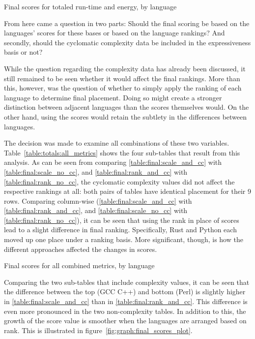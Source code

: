 \begin{table}[!htb]

\caption{Final scores for totaled run-time and energy, by language}
\label{table:totals:runtime-energy}
\end{table}

From here came a question in two parts: Should the final scoring be based on the languages' scores for these bases or based on the language rankings? And secondly, should the cyclomatic complexity data be included in the expressiveness basis or not?

While the question regarding the complexity data has already been discussed, it still remained to be seen whether it would affect the final rankings. More than this, however, was the question of whether to simply apply the ranking of each language to determine final placement. Doing so might create a stronger distinction between adjacent languages than the scores themselves would. On the other hand, using the scores would retain the subtlety in the differences between languages.

The decision was made to examine all combinations of these two variables. Table~\ref{table:totals:all_metrics} shows the four sub-tables that result from this analysis. As can be seen from comparing \ref{table:final:scale_and_cc} with \ref{table:final:scale_no_cc}, and \ref{table:final:rank_and_cc} with \ref{table:final:rank_no_cc}, the cyclomatic complexity values did not affect the respective rankings at all: both pairs of tables have identical placement for their 9 rows. Comparing column-wise (\ref{table:final:scale_and_cc} with \ref{table:final:rank_and_cc}, and \ref{table:final:scale_no_cc} with \ref{table:final:rank_no_cc}), it can be seen that using the rank in place of scores lead to a slight difference in final ranking. Specifically, Rust and Python each moved up one place under a ranking basis. More significant, though, is how the different approaches affected the changes in scores.

\begin{table}[!htb]

\caption{Final scores for all combined metrics, by language}
\label{table:totals:all_metrics}
\end{table}

Comparing the two sub-tables that include complexity values, it can be seen that the difference between the top (GCC C++) and bottom (Perl) is slightly higher in \ref{table:final:scale_and_cc} than in \ref{table:final:rank_and_cc}. This difference is even more pronounced in the two non-complexity tables. In addition to this, the growth of the score value is smoother when the languages are arranged based on rank. This is illustrated in figure~\ref{fig:graph:final_scores_plot}.

